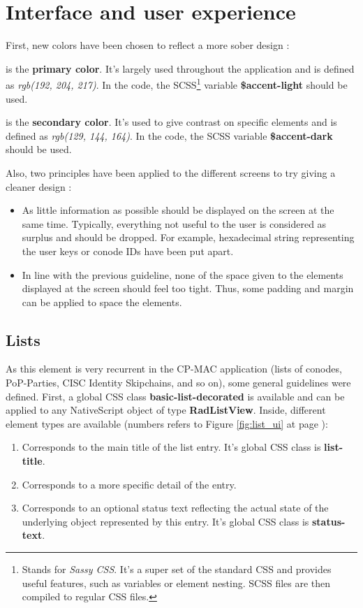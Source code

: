 
\section{Interface and user experience}
\label{sec:interface}

First, new colors have been chosen to reflect a more sober design :
\begin{description}
	\item {}  is the \textbf{primary color}. It's largely used throughout the application and is defined as \textit{rgb(192, 204, 217)}. In the code, the SCSS\footnote{Stands for \textit{Sassy CSS}. It's a super set of the standard CSS and provides useful features, such as variables or element nesting. SCSS files are then compiled to regular CSS files.} variable \textbf{\$accent-light} should be used.
	\item {} is the \textbf{secondary color}. It's used to give contrast on specific elements and is defined as \textit{rgb(129, 144, 164)}. In the code, the SCSS variable \textbf{\$accent-dark} should be used.
\end{description}

Also, two principles have been applied to the different screens to try giving a cleaner design :
\begin{itemize}
	\item As little information as possible should be displayed on the screen at the same time. Typically, everything not useful to the user is considered as surplus and should be dropped. For example, hexadecimal string representing the user keys or conode IDs have been put apart.
	\item In line with the previous guideline, none of the space given to the elements displayed at the screen should feel too tight. Thus, some padding and margin can be applied to space the elements.
\end{itemize}
\subsection{Lists}
\label{subsec:lists_ui}
As this element is very recurrent in the CP-MAC application (lists of conodes, PoP-Parties, CISC Identity Skipchains, and so on), some general guidelines were defined. First, a global CSS class \textbf{basic-list-decorated} is available and can be applied to any NativeScript object of type \textbf{RadListView}. Inside, different element types are available (numbers refers to Figure \ref{fig:list_ui} at page \pageref{fig:list_ui}):
\begin{enumerate}
	\item Corresponds to the main title of the list entry. It's global CSS class is \textbf{list-title}.
	\item Corresponds to a more specific detail of the entry.
	\item Corresponds to an optional status text reflecting the actual state of the underlying object represented by this entry. It's global CSS class is \textbf{status-text}.
\end{enumerate}

